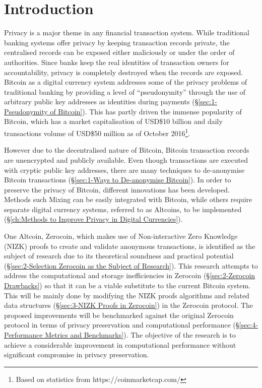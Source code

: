 \chapter*{Introduction}
Privacy is a major theme in any financial transaction system. While traditional banking systems offer privacy by keeping transaction records private, the centralised records can be exposed either maliciously or under the order of authorities. Since banks keep the real identities of transaction owners for accountability, privacy is completely destroyed when the records are exposed. Bitcoin as a digital currency system addresses some of the privacy problems of traditional banking by providing a level of “pseudonymity” through the use of arbitrary public key addresses as identities during payments (\S\ref{sec:1-Pseudonymity of Bitcoin}). This has partly driven the immense popularity of Bitcoin, which has a market capitalisation of USD\$10 billion and daily transactions volume of USD\$50 million as of October 2016\footnote{Based on statistics from https://coinmarketcap.com/}.

However due to the decentralised nature of Bitcoin, Bitcoin transaction records are unencrypted and publicly available. Even though transactions are executed with cryptic public key addresses, there are many techniques to de-anonymise Bitcoin transactions (\S\ref{sec:1-Ways to De-anonymise Bitcoin}). In order to preserve the privacy of Bitcoin, different innovations has been developed. Methods such Mixing can be easily integrated with Bitcoin, while others require separate digital currency systems, referred to as Altcoins, to be implemented (\S\ref{ch:Methods to Improve Privacy in Digital Currencies}).

One Altcoin, Zerocoin, which makes use of Non-interactive Zero Knowledge (NIZK) proofs to create and validate anonymous transactions, is identified as the subject of research due to its theoretical soundness and practical potential (\S\ref{sec:2-Selection Zerocoin as the Subject of Research}). This research attempts to address the computational and storage inefficiencies in Zerocoin (\S\ref{sec:2-Zerocoin Drawbacks}) so that it can be a viable substitute to the current Bitcoin system. This will be mainly done by modifying the NIZK proofs algorithms and related data structures (\S\ref{sec:3-NIZK Proofs in Zerocoin}) in the Zerocoin protocol. The proposed improvements will be benchmarked against the original Zerocoin protocol in terms of privacy preservation and computational performance (\S\ref{sec:4-Performance Metrics and Benchmarks}). The objective of the research is to achieve a considerable improvement in computational performance without significant compromise in privacy preservation.

